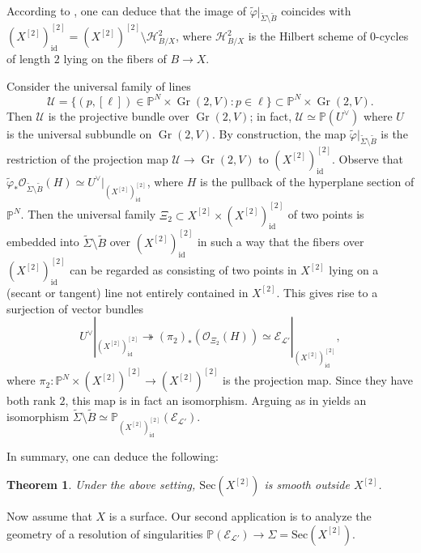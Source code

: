 \documentclass[a4paper]{amsart}
\numberwithin{equation}{section}
\theoremstyle{plain}
\newtheorem{thm}{Theorem}[section]
\theoremstyle{definition}
\theoremstyle{remark}
\numberwithin{figure}{section}
\numberwithin{table}{section}
\numberwithin{equation}{section}
\def \PP {\mathbb{P}}
\def \Ecal {\mathcal{E}}
\def \Hcal {\mathcal{H}}
\def \Lcal {\mathcal{L}}
\def \Ocal {\mathcal{O}}
\def \Ucal {\mathcal{U}}
\DeclareMathOperator{\Gr}{Gr}
\begin{document}
According to \cite[Lemma~3.5-3.7]{Vermeire2001}, one can deduce that the image of $\widetilde{\varphi}|_{\widetilde{\Sigma} \setminus \widetilde{B}}$ coincides with $(X^{[2]})_{\mathrm{id}}^{[2]} = (X^{[2]})^{[2]} \setminus \Hcal_{B/X}^{2}$, where $\Hcal_{B/X}^{2}$ is the Hilbert scheme of $0$-cycles of length $2$ lying on the fibers of $B \rightarrow X$.

Consider the universal family of lines
 \[
  \Ucal = \{ (p,[\ell]) \in \PP^N \times \Gr(2,V): p \in \ell \} \subset \PP^N \times \Gr(2,V).
 \]
Then $\Ucal$ is the projective bundle over $\Gr(2,V)$; in fact, $\Ucal \simeq \PP(U^{\vee})$ where $U$ is the universal subbundle on $\Gr(2,V)$.
By construction, the map $\widetilde{\varphi}|_{\widetilde{\Sigma} \setminus \widetilde{B}}$ is the restriction of the projection map $\Ucal \rightarrow \Gr(2,V)$ to $(X^{[2]})_{\mathrm{id}}^{[2]}$.
Observe that $\widetilde{\varphi}_{\ast} \Ocal_{\widetilde{\Sigma} \setminus \widetilde{B}}(H) \simeq U^{\vee}|_{(X^{[2]})_{\mathrm{id}}^{[2]}}$, where $H$ is the pullback of the hyperplane section of $\PP^N$.
Then the universal family $\Xi_2 \subset X^{[2]} \times (X^{[2]})_{\mathrm{id}}^{[2]}$ of two points is embedded into $\widetilde{\Sigma} \setminus \widetilde{B}$ over $(X^{[2]})_{\mathrm{id}}^{[2]}$ in such a way that the fibers over $(X^{[2]})_{\mathrm{id}}^{[2]}$ can be regarded as consisting of two points in $X^{[2]}$ lying on a (secant or tangent) line not entirely contained in $X^{[2]}$.
This gives rise to a surjection of vector bundles
 \[
  U^{\vee}|_{(X^{[2]})_{\mathrm{id}}^{[2]}} \twoheadrightarrow (\pi_2)_{\ast}(\Ocal_{\Xi_2}(H)) \simeq \Ecal_{\Lcal'}|_{(X^{[2]})_{\mathrm{id}}^{[2]}},
 \]
where $\pi_2:\PP^N \times (X^{[2]})^{[2]} \rightarrow (X^{[2]})^{[2]}$ is the projection map.
Since they have both rank $2$, this map is in fact an isomorphism.
Arguing as in \cite[Theorem~3.9]{Vermeire2001} yields an isomorphism $\widetilde{\Sigma} \setminus \widetilde{B} \simeq \PP_{(X^{[2]})_{\mathrm{id}}^{[2]}}(\Ecal_{\Lcal'})$.

In summary, one can deduce the following:

\begin{thm} \label{thm:smoothness-of-secant}
    Under the above setting, $\mathrm{Sec}(X^{[2]})$ is smooth outside $X^{[2]}$.
\end{thm}

Now assume that $X$ is a surface.
Our second application is to analyze the geometry of a resolution of singularities $\PP(\Ecal_{\Lcal'}) \rightarrow \Sigma = \mathrm{Sec}(X^{[2]})$.
\end{document}
